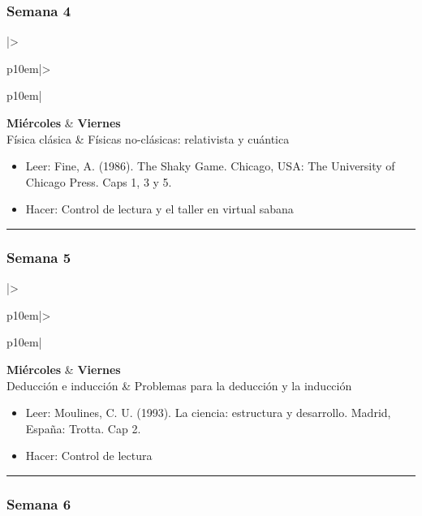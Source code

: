 \documentclass[spanish,]{article}
\begin{document}
\subsubsection{Semana 4}\label{semana-4}

\begin{tabular}{|>{\raggedright\arraybackslash}p{10em}|>{\raggedright\arraybackslash}p{10em}|}
\hline
\textbf{Miércoles} & \textbf{Viernes}\\
\hline
Física clásica & Físicas no-clásicas: relativista y cuántica\\
\hline
\end{tabular}

\begin{itemize}
\item
  Leer: Fine, A. (1986). The Shaky Game. Chicago, USA: The
  University of Chicago Press. Caps 1, 3 y 5.
\item
  Hacer: Control de lectura y el taller en virtual sabana
\end{itemize}

\begin{center}\rule{0.5\linewidth}{\linethickness}\end{center}

\subsubsection{Semana 5}\label{semana-5}

\begin{tabular}{|>{\raggedright\arraybackslash}p{10em}|>{\raggedright\arraybackslash}p{10em}|}
\hline
\textbf{Miércoles} & \textbf{Viernes}\\
\hline
Deducción e inducción & Problemas para la deducción y la inducción\\
\hline
\end{tabular}

\begin{itemize}
\item
  Leer: Moulines, C. U. (1993). La ciencia: estructura y desarrollo.
  Madrid, España: Trotta. Cap 2.
\item
  Hacer: Control de lectura
\end{itemize}

\begin{center}\rule{0.5\linewidth}{\linethickness}\end{center}

\subsubsection{Semana 6}\label{semana-6}
\end{document}
